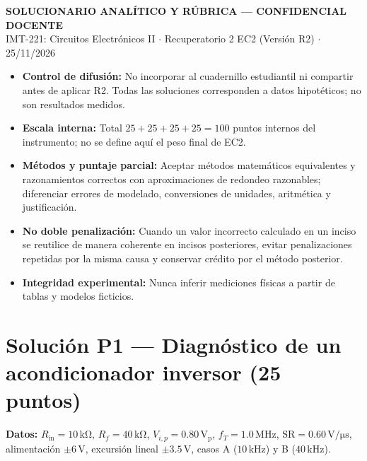 \documentclass[10pt, a4paper]{article}
\begin{document}
\begin{center}
    {\Large\textbf{\textcolor{docred}{SOLUCIONARIO ANALÍTICO Y RÚBRICA --- CONFIDENCIAL DOCENTE}}}\\[0.08cm]
    {\normalsize IMT-221: Circuitos Electrónicos II $\cdot$ Recuperatorio 2 EC2 (Versión R2) $\cdot$ 25/11/2026}
\end{center}

\begin{tcolorbox}[colback=warnbg, colframe=docred, title=\textbf{Política de Corrección, Puntaje Parcial y Control de Difusión}]
    \footnotesize
    \begin{itemize}
        \setlength{\itemsep}{2pt}
        \item \textbf{Control de difusión:} No incorporar al cuadernillo estudiantil ni compartir antes de aplicar R2. Todas las soluciones corresponden a datos hipotéticos; no son resultados medidos.
        \item \textbf{Escala interna:} Total $25 + 25 + 25 + 25 = 100$ puntos internos del instrumento; no se define aquí el peso final de EC2.
        \item \textbf{Métodos y puntaje parcial:} Aceptar métodos matemáticos equivalentes y razonamientos correctos con aproximaciones de redondeo razonables; diferenciar errores de modelado, conversiones de unidades, aritmética y justificación.
        \item \textbf{No doble penalización:} Cuando un valor incorrecto calculado en un inciso se reutilice de manera coherente en incisos posteriores, evitar penalizaciones repetidas por la misma causa y conservar crédito por el método posterior.
        \item \textbf{Integridad experimental:} Nunca inferir mediciones físicas a partir de tablas y modelos ficticios.
    \end{itemize}
\end{tcolorbox}

\section*{Solución P1 --- Diagnóstico de un acondicionador inversor (25 puntos)}

\textbf{Datos:} $R_{\mathrm{in}} = 10\,\mathrm{k\Omega}$, $R_f = 40\,\mathrm{k\Omega}$, $V_{i,p} = 0.80\,\mathrm{V_p}$, $f_T = 1.0\,\mathrm{MHz}$, $\mathrm{SR} = 0.60\,\mathrm{V/\mu s}$, alimentación $\pm 6\,\mathrm{V}$, excursión lineal $\pm 3.5\,\mathrm{V}$, casos A ($10\,\mathrm{kHz}$) y B ($40\,\mathrm{kHz}$).
\end{document}
